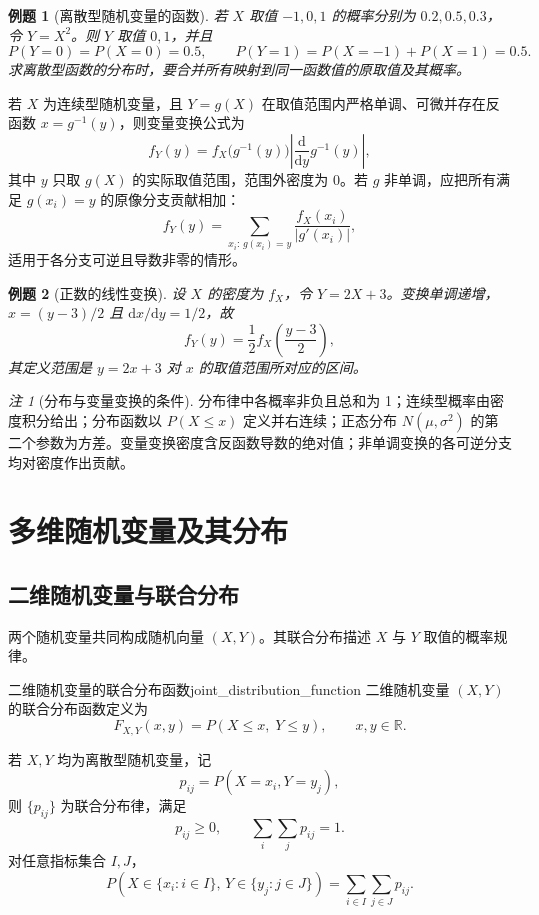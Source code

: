 \documentclass[11pt,a4paper,fontset=fandol]{ctexart}
\newtheorem{example}{例题}[section]
\theoremstyle{remark}
\newtheorem{remark}{注}[section]
\begin{document}
\begin{example}[离散型随机变量的函数]
若 $X$ 取值 $-1,0,1$ 的概率分别为 $0.2,0.5,0.3$，令 $Y=X^2$。则 $Y$ 取值 $0,1$，并且
\[
    P(Y=0)=P(X=0)=0.5,\qquad
    P(Y=1)=P(X=-1)+P(X=1)=0.5.
\]
求离散型函数的分布时，要合并所有映射到同一函数值的原取值及其概率。
\end{example}

若 $X$ 为连续型随机变量，且 $Y=g(X)$ 在取值范围内严格单调、可微并存在反函数 $x=g^{-1}(y)$，则变量变换公式为
\[
    f_Y(y)=f_X\bigl(g^{-1}(y)\bigr)
    \left|\frac{\mathrm{d}}{\mathrm{d}y}g^{-1}(y)\right|,
\]
其中 $y$ 只取 $g(X)$ 的实际取值范围，范围外密度为 $0$。若 $g$ 非单调，应把所有满足 $g(x_i)=y$ 的原像分支贡献相加：
\[
    f_Y(y)=\sum_{x_i:\,g(x_i)=y}
    \frac{f_X(x_i)}{|g'(x_i)|},
\]
适用于各分支可逆且导数非零的情形。

\begin{example}[正数的线性变换]
设 $X$ 的密度为 $f_X$，令 $Y=2X+3$。变换单调递增，$x=(y-3)/2$ 且 $\mathrm{d}x/\mathrm{d}y=1/2$，故
\[
    f_Y(y)=\frac{1}{2}f_X\left(\frac{y-3}{2}\right),
\]
其定义范围是 $y=2x+3$ 对 $x$ 的取值范围所对应的区间。
\end{example}

\begin{remark}[分布与变量变换的条件]
分布律中各概率非负且总和为 1；连续型概率由密度积分给出；分布函数以 $P(X\leq x)$ 定义并右连续；正态分布 $N(\mu,\sigma^2)$ 的第二个参数为方差。变量变换密度含反函数导数的绝对值；非单调变换的各可逆分支均对密度作出贡献。
\end{remark}

\clearpage
\section{多维随机变量及其分布}
\subsection{二维随机变量与联合分布}
两个随机变量共同构成随机向量 $(X,Y)$。其联合分布描述 $X$ 与 $Y$ 取值的概率规律。

\begin{definition}{二维随机变量的联合分布函数}{joint_distribution_function}
二维随机变量 $(X,Y)$ 的联合分布函数定义为
\[
    F_{X,Y}(x,y)=P(X\leq x,\;Y\leq y),
    \qquad x,y\in\mathbb{R}.
\]
\end{definition}

若 $X,Y$ 均为离散型随机变量，记
\[
    p_{ij}=P(X=x_i,Y=y_j),
\]
则 $\{p_{ij}\}$ 为联合分布律，满足
\[
    p_{ij}\geq 0,\qquad \sum_i\sum_jp_{ij}=1.
\]
对任意指标集合 $I,J$，
\[
    P(X\in\{x_i:i\in I\},\,Y\in\{y_j:j\in J\})
    =\sum_{i\in I}\sum_{j\in J}p_{ij}.
\]
\end{document}
